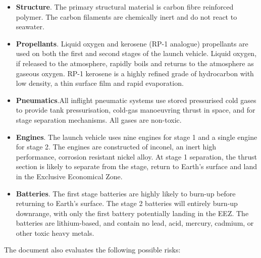 \begin{itemize}
\item \textbf{Structure}. The primary structural material is carbon fibre reinforced polymer. The carbon filaments are chemically inert and do not react to seawater.
\item \textbf{Propellants}. Liquid oxygen and kerosene (RP-1 analogue) propellants are used on both the first and second stages of the launch vehicle. Liquid oxygen, if released to the atmosphere, rapidly boils and returns to the atmosphere as gaseous oxygen. RP-1 kerosene is a highly refined grade of hydrocarbon with low density, a thin surface film and rapid evaporation.
\item \textbf{Pneumatics}.All inflight pneumatic systems use stored pressurised cold gases to provide tank pressurisation, cold-gas manoeuvring thrust in space, and for stage separation mechanisms. All gases are non-toxic.
\item \textbf{Engines}. The launch vehicle uses nine engines for stage 1 and a single engine for stage 2. The engines are constructed of inconel, an inert high performance, corrosion resistant nickel alloy. At stage 1 separation, the thrust section is likely to separate from the stage, return to Earth’s surface and land in the Exclusive Economical Zone.
\item \textbf{Batteries}. The first stage batteries are highly likely to burn-up before returning to Earth’s surface. The stage 2 batteries will entirely burn-up downrange, with only the first battery potentially landing in the EEZ. The batteries are lithium-based, and contain no lead, acid, mercury, cadmium, or other toxic heavy metals.
\end{itemize}

The document also evaluates the following possible risks:


